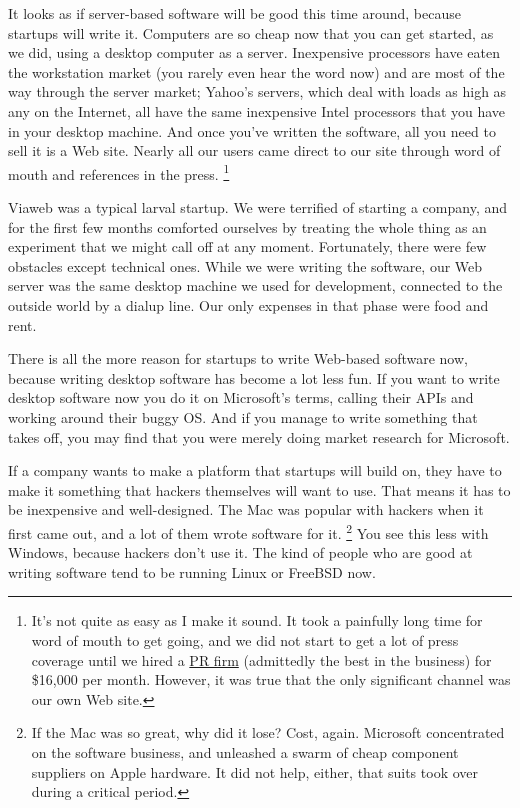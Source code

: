It looks as if server-based software will be good this time around,
because startups will write it. Computers are so cheap now that you can
get started, as we did, using a desktop computer as a server.
Inexpensive processors have eaten the workstation market (you rarely
even hear the word now) and are most of the way through the server
market; Yahoo's servers, which deal with loads as high as any on the
Internet, all have the same inexpensive Intel processors that you have
in your desktop machine. And once you've written the software, all you
need to sell it is a Web site. Nearly all our users came direct to our
site through word of mouth and references in the press. \footnote{It's not quite as easy as I make it sound. It took a painfully
long time for word of mouth to get going, and we did not start to get a
lot of press coverage until we hired a
\href{http://www.schwartz-pr.com}{PR firm} (admittedly the best in the
business) for \$16,000 per month. However, it was true that the only
significant channel was our own Web site.}

Viaweb was a typical larval startup. We were terrified of starting a
company, and for the first few months comforted ourselves by treating
the whole thing as an experiment that we might call off at any moment.
Fortunately, there were few obstacles except technical ones. While we
were writing the software, our Web server was the same desktop machine
we used for development, connected to the outside world by a dialup
line. Our only expenses in that phase were food and rent.

There is all the more reason for startups to write Web-based software
now, because writing desktop software has become a lot less fun. If you
want to write desktop software now you do it on Microsoft's terms,
calling their APIs and working around their buggy OS. And if you manage
to write something that takes off, you may find that you were merely
doing market research for Microsoft.

If a company wants to make a platform that startups will build on, they
have to make it something that hackers themselves will want to use. That
means it has to be inexpensive and well-designed. The Mac was popular
with hackers when it first came out, and a lot of them wrote software
for it. \footnote{If the Mac was so great, why did it lose? Cost, again.
Microsoft concentrated on the software business, and unleashed a swarm
of cheap component suppliers on Apple hardware. It did not help, either,
that suits took over during a critical period.} You see this less with Windows, because hackers don't
use it. The kind of people who are good at writing software tend to be
running Linux or FreeBSD now.


